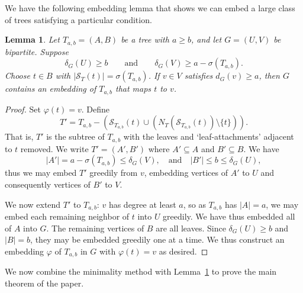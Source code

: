 \documentclass[12pt]{article}
\newtheorem{lemma}[theorem]{Lemma}
\theoremstyle{definition}
\theoremstyle{remark}
\begin{document}
\noindent We have the following embedding lemma that shows we can embed a large class of trees satisfying a particular condition.


\begin{lemma}
\label{lem:embedding}
Let $T_{a,b}=(A,B)$ be a tree with $a\ge b$, and let $G=(U,V)$ be bipartite. Suppose
\[
    \delta_G(U)\ge b\qquad\text{and}\qquad\delta_G(V)\ge a-\sigma(T_{a,b}).
\]
Choose $t\in B$ with $|\mathcal S_T(t)|=\sigma(T_{a,b})$. If $v\in V$ satisfies $d_G(v)\ge a$, then $G$ contains an embedding of $T_{a,b}$ that maps $t$ to $v$.
\end{lemma}



\begin{proof}
Set $\varphi(t)=v$. Define 
\[
T'=T_{a,b}-(\mathcal{S}_{T_{a,b}}(t)\cup (N_T(\mathcal{S}_{T_{a,b}}(t))\setminus\{t\})).
\]
That is, $T'$ is the subtree of $T_{a,b}$ with the leaves and `leaf-attachments' adjacent to $t$ removed.  We write $T'=(A',B')$ where $A'\subseteq A$ and $B'\subseteq B$.  We have 
\[
|A'|=a-\sigma(T_{a,b})\leq\delta_G(V),\quad \text{and}\quad|B'|\leq b\leq\delta_G(U),
\]
thus we may embed $T'$ greedily from $v$, embedding vertices of $A'$ to $U$ and consequently vertices of $B'$ to $V$.

We now extend $T'$ to $T_{a,b}$: $v$ has degree at least $a$, so as $T_{a,b}$ has $|A|=a$, we may embed each remaining neighbor of $t$ into $U$ greedily. We have thus embedded all of $A$ into $G$. The remaining vertices of $B$ are all leaves. Since $\delta_G(U)\geq b$ and $|B|=b$, they may be embedded greedily one at a time. We thus construct an embedding $\varphi$ of $T_{a,b}$ in $G$ with $\varphi(t)=v$ as desired.
\end{proof}

\noindent We now combine the minimality method with Lemma~\ref{lem:embedding} to prove the main theorem of the paper.
\end{document}
